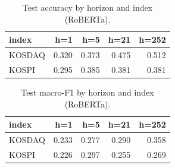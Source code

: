 \begin{table}[t]\centering
\caption{Test accuracy by horizon and index (RoBERTa).}
\begin{tabular}{lrrrr}
\toprule
index & h=1 & h=5 & h=21 & h=252 \\
\midrule
KOSDAQ & 0.320 & 0.373 & 0.475 & 0.512 \\
KOSPI & 0.295 & 0.385 & 0.381 & 0.381 \\
\bottomrule
\end{tabular}
\end{table}

\begin{table}[t]\centering
\caption{Test macro-F1 by horizon and index (RoBERTa).}
\begin{tabular}{lrrrr}
\toprule
index & h=1 & h=5 & h=21 & h=252 \\
\midrule
KOSDAQ & 0.233 & 0.277 & 0.290 & 0.358 \\
KOSPI & 0.226 & 0.297 & 0.255 & 0.269 \\
\bottomrule
\end{tabular}
\end{table}